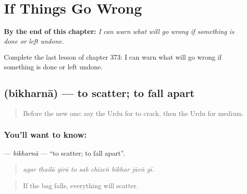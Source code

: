 
\chapter{If Things Go Wrong}
\label{ch:ur-if-things-go-wrong}

\begin{chapteropening}
\textbf{By the end of this chapter:} \emph{I can warn what will go wrong if something is done or left undone.}

Complete the last lesson of chapter 373: I can warn what will go wrong if something is done or left undone.
\end{chapteropening}

\section[\texorpdfstring{\ur{بکھرنا} (bikharnā)}{بکھرنا (bikharnā)}]{ (bikharnā) — to scatter; to fall apart}

\label{lesson:UR-C373-bikharna}



\begin{quote}
Before the new one: say the Urdu for to crack, then the Urdu for medium.
\end{quote}

\subsection*{You'll want to know: }
\textbf{} — \emph{bikharnā} — \textquotedblleft{}to scatter; to fall apart\textquotedblright{}.

\begin{quote}
        
\end{quote}

\begin{quote}
\emph{agar thailā girā to sab chīzeṅ bikhar jāeṅ gī.}
\end{quote}

\begin{quote}
If the bag falls, everything will scatter.
\end{quote}

